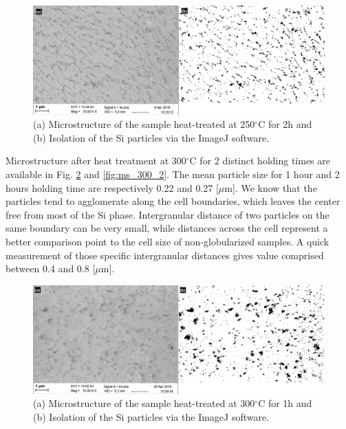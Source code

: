 \begin{figure}[ht]
	\centering
	\centerline{\includegraphics[scale=0.30]{Images/SEM-TT250-2-real-06.jpg}}
	\decoRule
	\caption[(a) Microstructure of the sample heat-treated at 250$^\circ$C for 2h and (b) Isolation of the Si particles via the ImageJ software]{(a) Microstructure of the sample heat-treated at 250$^\circ$C for 2h and (b) Isolation of the Si particles via the ImageJ software.}
	\label{fig:ms_250_2}
\end{figure}

Microstructure after heat treatment at 300$^\circ$C for 2 distinct holding times are available in Fig. \ref{fig:ms_300_1} and \ref{fig:ms_300_2}. The mean particle size for 1 hour and 2 hours holding time are respectively 0.22 and 0.27 [$\mu$m]. We know that the particles tend to agglomerate along the cell boundaries, which leaves the center free from most of the Si phase. Intergranular distance of two particles on the same boundary can be very small, while distances across the cell represent a better comparison point to the cell size of non-globularized samples. A quick measurement of those specific intergranular distances gives value comprised between 0.4 and 0.8 [$\mu$m].

\begin{figure}[ht]
	\centering
	\centerline{\includegraphics[scale=0.30]{Images/SEM-TT300-1-real_12.png}}
	\decoRule
	\caption[(a) Microstructure of the sample heat-treated at 300$^\circ$C for 1h and (b) Isolation of the Si particles via the ImageJ software]{(a) Microstructure of the sample heat-treated at 300$^\circ$C for 1h and (b) Isolation of the Si particles via the ImageJ software.}
	\label{fig:ms_300_1}
\end{figure}

